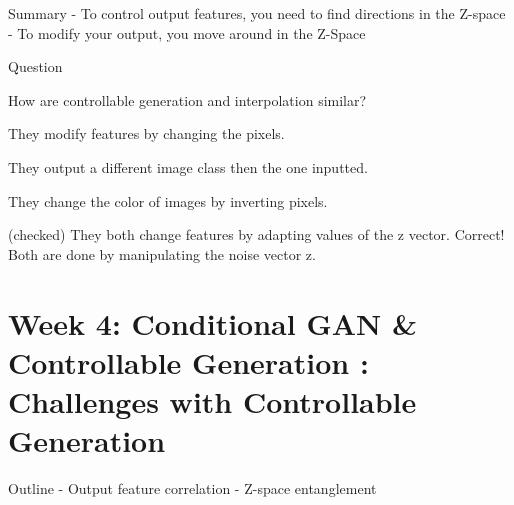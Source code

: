 \documentclass[11pt, onecolumn]{article}
\begin{document}
Summary
- To control output features, you need to find directions in the Z-space
- To modify your output, you move around in the Z-Space

Question

How are controllable generation and interpolation similar?

They modify features by changing the pixels.

They output a different image class then the one inputted.

They change the color of images by inverting pixels.

(checked) They both change features by adapting values of the z vector.
Correct! Both are done by manipulating the noise vector z.

\section{Week 4: Conditional GAN \& Controllable Generation : Challenges with Controllable Generation}

Outline
- Output feature correlation
- Z-space entanglement
\end{document}
